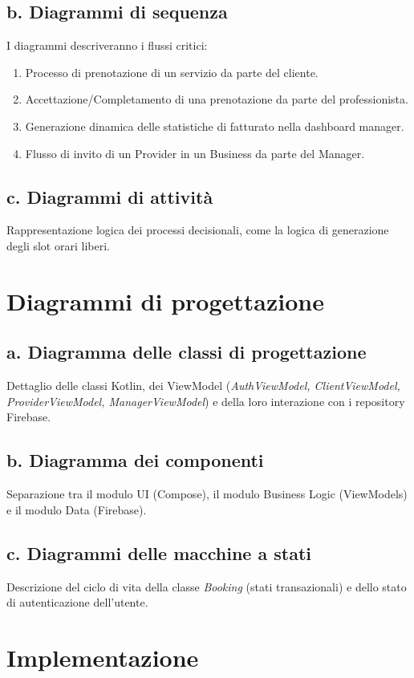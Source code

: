 \documentclass[12pt]{article}
\begin{document}
\subsection{b. Diagrammi di sequenza}
I diagrammi descriveranno i flussi critici:
\begin{enumerate}
    \item Processo di prenotazione di un servizio da parte del cliente.
    \item Accettazione/Completamento di una prenotazione da parte del professionista.
    \item Generazione dinamica delle statistiche di fatturato nella dashboard manager.
    \item Flusso di invito di un Provider in un Business da parte del Manager.
\end{enumerate}

\subsection{c. Diagrammi di attività}
Rappresentazione logica dei processi decisionali, come la logica di generazione degli slot orari liberi.

\newpage
\section{Diagrammi di progettazione}
\subsection{a. Diagramma delle classi di progettazione}
Dettaglio delle classi Kotlin, dei ViewModel (\textit{AuthViewModel, ClientViewModel, ProviderViewModel, ManagerViewModel}) e della loro interazione con i repository Firebase.

\subsection{b. Diagramma dei componenti}
Separazione tra il modulo UI (Compose), il modulo Business Logic (ViewModels) e il modulo Data (Firebase).

\subsection{c. Diagrammi delle macchine a stati}
Descrizione del ciclo di vita della classe \textit{Booking} (stati transazionali) e dello stato di autenticazione dell'utente.

\newpage
\section{Implementazione}
\end{document}
